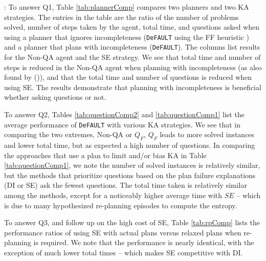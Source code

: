 \documentclass{article}
\def\und#1{\noindent{\bf #1}:}
\def\citep#1{\cite{#1}}
\def\citet#1{\citeauthor{#1} (\citeyear{#1})}
\def\FFRISKY{{\tt DeFAULT}}
\def\default{{\tt DeFAULT}}
\begin{document}
\und{Results} To answer Q1, Table \ref{tab:plannerComp} compares two planners
and two KA strategies.  The entries in the table are the ratio of
the number of problems solved, number of steps taken by the agent, total time,
and questions asked when using a planner that ignores incompleteness
(\default{} using the FF heuristic \citep{hoffmann:nebel:jair-01}) and a planner
that plans with incompleteness (\default{}).  The columns list results for the
Non-QA agent and the SE strategy.  We see that total time and number of steps is
reduced in the Non-QA agent when planning with incompleteness (as also found by
\citet{bryce-icaps11}), and that the total time and number of questions is
reduced when using SE.  The
results demonstrate that planning with incompleteness is beneficial whether
asking questions or not.

To answer Q2, Tables \ref{tab:questionComp2} and \ref{tab:questionComp1} list
the average performance of \default{} with various KA strategies.
We see that in comparing the two extremes, Non-QA or $Q_F$, $Q_F$ leads to more
solved instances and lower total time, but as expected a high number of
questions.  In comparing the approaches that use a plan to limit and/or bias
KA in Table \ref{tab:questionComp1}, we note the number of solved
instances is relatively similar, but the methods that prioritize questions based
on the plan failure explanations (DI or SE) ask the fewest questions.  The total
time taken is relatively similar among the methods, except for a noticeably higher average
time with $SE$ -- which is due to many hypothesized re-planning
episodes to compute the entropy.

To answer Q3, and follow up on the high cost of SE, Table \ref{tab:rpComp} lists
the performance ratios of using SE with actual plans versus relaxed plans when
re-planning is required.  We note that the performance is nearly identical, with
the exception of much lower total times -- which makes SE
competitive with DI.



\end{document}

